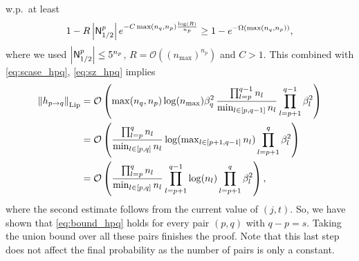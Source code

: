 \documentclass[11pt]{article}
\newcommand{\bigO}[1]{\mathcal{O}\left(#1\right)}
\newcommand{\bigOmg}[1]{\Omega\left(#1\right)}
\newcommand{\norm}[1]{\left\|#1\right\|}
\newcommand{\abs}[1]{\left|#1\right|}
\def\Lip{\mathrm{Lip}}
\def\min{\mathop{\rm min}\nolimits}
\def\max{\mathop{\rm max}\nolimits}
\begin{document}
    w.p.\ at least 
    \begin{align*}
	1-R\abs{{\sf N}_{1/2}^p} e^{-C\max(n_q,n_p)\frac{\log(R)}{n_p}} \geq 1-e^{-\bigOmg{\max(n_q,n_p)}},
    \end{align*}
    where we used $\abs{{\sf N}_{1/2}^p}\leq 5^{n_p}$, $R=\bigO{(n_{\mathrm{max}})^{n_p}}$ and $C>1.$
    This combined with \eqref{eq:scase_hpq}, \eqref{eq:sz_hpq} implies
    \begin{align*}
	\norm{h_{p\to q}}_{\Lip}
	&=\bigO{ \max(n_q,n_p) \log(n_{\mathrm{max}}) \beta_q^2 \, \frac{\prod_{l=p}^{q-1} n_l}{\min_{l\in[p,q-1]}n_l} \prod_{l=p+1}^{q-1}\beta_l^2 }\\
	&=\bigO{ \frac{\prod_{l=p}^{q} n_l}{\min_{l\in[p,q]}n_l} \log(\max_{l\in[p+1,q-1]}n_l) \prod_{l=p+1}^{q}\beta_l^2 } \\
	&=\bigO{ \frac{\prod_{l=p}^{q} n_l}{\min_{l\in[p,q]}n_l} \prod_{l=p+1}^{q-1}\log(n_l) \prod_{l=p+1}^{q}\beta_l^2 } ,
    \end{align*}
    where the second estimate follows from the current value of $(j,t).$
    So, we have shown that \eqref{eq:bound_hpq} holds for every pair $(p,q)$ with $q-p=s.$
    Taking the union bound over all these pairs finishes the proof. 
    Note that this last step does not affect the final probability as the number of pairs is only a constant.
\end{document}
